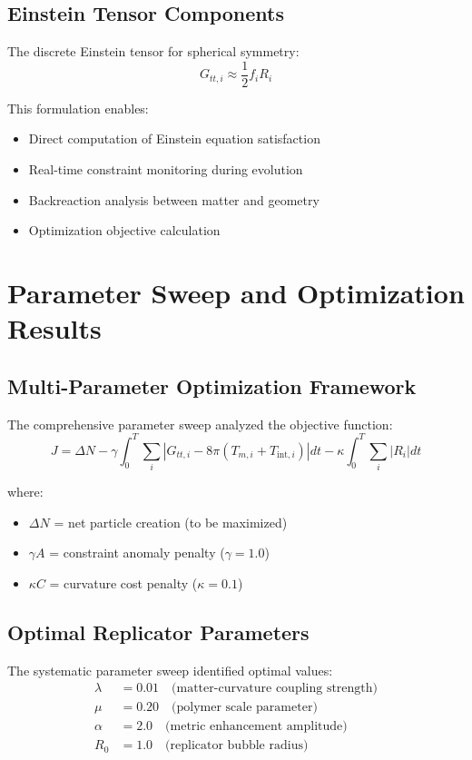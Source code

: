 \documentclass[11pt]{article}
\begin{document}
\subsection{Einstein Tensor Components}

The discrete Einstein tensor for spherical symmetry:
\begin{equation}
G_{tt,i} \approx \frac{1}{2}f_i R_i
\end{equation}

This formulation enables:
\begin{itemize}
\item Direct computation of Einstein equation satisfaction
\item Real-time constraint monitoring during evolution
\item Backreaction analysis between matter and geometry
\item Optimization objective calculation
\end{itemize}

\section{Parameter Sweep and Optimization Results}

\subsection{Multi-Parameter Optimization Framework}

The comprehensive parameter sweep analyzed the objective function:
\begin{equation}
J = \Delta N - \gamma \int_0^T \sum_i |G_{tt,i} - 8\pi(T_{m,i} + T_{\text{int},i})| dt - \kappa \int_0^T \sum_i |R_i| dt
\end{equation}

where:
\begin{itemize}
\item $\Delta N$ = net particle creation (to be maximized)
\item $\gamma A$ = constraint anomaly penalty ($\gamma = 1.0$)
\item $\kappa C$ = curvature cost penalty ($\kappa = 0.1$)
\end{itemize}

\subsection{Optimal Replicator Parameters}

The systematic parameter sweep identified optimal values:
\begin{align}
\lambda &= 0.01 \quad \text{(matter-curvature coupling strength)} \\
\mu &= 0.20 \quad \text{(polymer scale parameter)} \\
\alpha &= 2.0 \quad \text{(metric enhancement amplitude)} \\
R_0 &= 1.0 \quad \text{(replicator bubble radius)}
\end{align}
\end{document}

